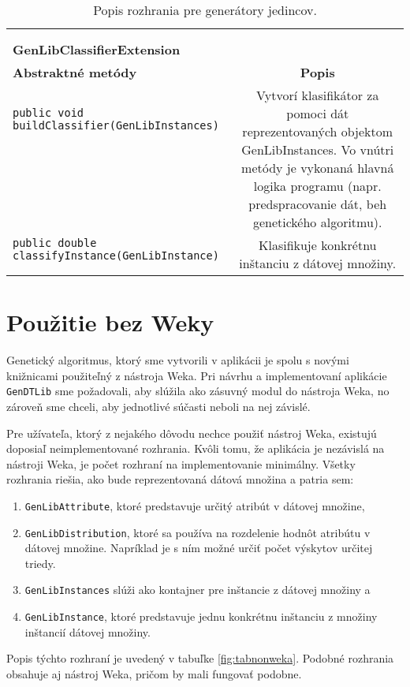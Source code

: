 \begin{table}
\begin{tabular}{|l|c|}
& \\ 
& \\ 
\hline
\hline
\textbf{GenLibClassifierExtension} & \\
\hline\hline
\textbf{Abstraktné metódy} & \textbf{Popis} \\
\hline
\verb|public void buildClassifier(GenLibInstances)| & \multirow{8}{5cm}{Vytvorí klasifikátor za pomoci dát reprezentovaných objektom GenLibInstances. Vo vnútri metódy je vykonaná hlavná logika programu (napr. predspracovanie dát, beh genetického algoritmu).} \\
& \\
& \\
& \\ 
& \\ 
& \\ 
& \\ 
& \\ 
\hline
\verb|public double classifyInstance(GenLibInstance)| & \multirow{3}{5cm}{Klasifikuje konkrétnu inštanciu z dátovej množiny.} \\
& \\ 
& \\ 
\hline
\hline
\end{tabular}
\caption{Popis rozhrania pre generátory jedincov.}\label{fig:tabclass}
\end{table}
\section{Použitie bez Weky}
Genetický algoritmus, ktorý sme vytvorili v aplikácii je spolu s novými knižnicami použiteľný z nástroja Weka. Pri návrhu a implementovaní aplikácie \verb|GenDTLib| sme požadovali, aby slúžila ako zásuvný modul do nástroja Weka, no zároveň sme chceli, aby jednotlivé súčasti neboli na nej závislé. 

Pre užívateľa, ktorý z nejakého dôvodu nechce použiť nástroj Weka, existujú doposiaľ neimplementované rozhrania. Kvôli tomu, že aplikácia je nezávislá na nástroji Weka, je počet rozhraní na implementovanie minimálny. Všetky rozhrania riešia, ako bude reprezentovaná dátová množina a patria sem:
\begin{enumerate}
\item \verb|GenLibAttribute|, ktoré predstavuje určitý atribút v dátovej množine,
\item \verb|GenLibDistribution|, ktoré sa používa na rozdelenie hodnôt atribútu v dátovej množine. Napríklad je s ním možné určiť počet výskytov určitej triedy.
\item \verb|GenLibInstances| slúži ako kontajner pre inštancie z dátovej množiny a
\item \verb|GenLibInstance|, ktoré predstavuje jednu konkrétnu inštanciu z množiny inštancií dátovej množiny.
\end{enumerate}
Popis týchto rozhraní je uvedený v tabuľke \ref{fig:tabnonweka}. Podobné rozhrania obsahuje aj nástroj Weka, pričom by mali fungovať podobne.


